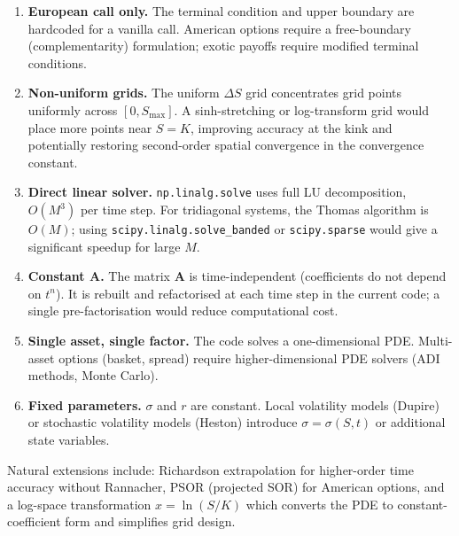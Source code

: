 \documentclass[12pt, a4paper]{article}
\begin{document}
\begin{enumerate}
    \item \textbf{European call only.} The terminal condition and upper
          boundary are hardcoded for a vanilla call. American options require
          a free-boundary (complementarity) formulation; exotic payoffs require
          modified terminal conditions.

    \item \textbf{Non-uniform grids.} The uniform $\Delta S$ grid concentrates
          grid points uniformly across $[0, S_{\max}]$. A sinh-stretching or
          log-transform grid would place more points near $S = K$, improving
          accuracy at the kink and potentially restoring second-order spatial
          convergence in the convergence constant.

    \item \textbf{Direct linear solver.} \texttt{np.linalg.solve} uses
          full LU decomposition, $O(M^3)$ per time step. For tridiagonal
          systems, the Thomas algorithm is $O(M)$; using
          \texttt{scipy.linalg.solve\_banded} or \texttt{scipy.sparse} would
          give a significant speedup for large $M$.

    \item \textbf{Constant $\mathbf{A}$.} The matrix $\mathbf{A}$ is
          time-independent (coefficients do not depend on $t^n$). It is
          rebuilt and refactorised at each time step in the current code; a
          single pre-factorisation would reduce computational cost.

    \item \textbf{Single asset, single factor.} The code solves a
          one-dimensional PDE. Multi-asset options (basket, spread) require
          higher-dimensional PDE solvers (ADI methods, Monte Carlo).

    \item \textbf{Fixed parameters.} $\sigma$ and $r$ are constant. Local
          volatility models (Dupire) or stochastic volatility models (Heston)
          introduce $\sigma = \sigma(S, t)$ or additional state variables.
\end{enumerate}

Natural extensions include: Richardson extrapolation for higher-order time
accuracy without Rannacher, PSOR (projected SOR) for American options, and
a log-space transformation $x = \ln(S/K)$ which converts the PDE to
constant-coefficient form and simplifies grid design.

\end{document}
